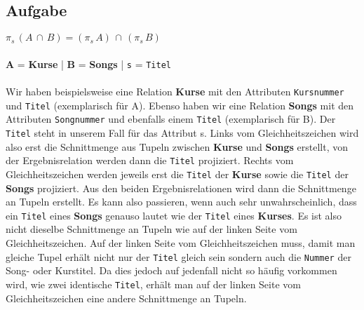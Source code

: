 \documentclass[11pt,a4paper,DIV=9]{scrartcl}
\newcounter{temp}
\newcommand{\aufgabe}[1]{
  \setcounter{temp}{\value{subsection}}
  \setcounter{subsection}{#1}
  \addtocounter{subsection}{-1}
  \subsection{Aufgabe}
  \setcounter{subsection}{\value{temp}}
}
\begin{document}
\aufgabe{3}
$ \pi _{s}\, (A\, \cap \, B) = (\pi _{s} \, A)\, \cap \,(\pi _{s}\, B)$
\\\\ \textbf{A} = \textbf{Kurse} | \textbf{B} = \textbf{Songs} | \texttt{s} = \texttt{Titel} 
\\\\Wir haben beispielsweise eine Relation \textbf{Kurse} mit den Attributen \texttt{Kursnummer} und \texttt{Titel} (exemplarisch f\"ur A). Ebenso haben wir eine Relation \textbf{Songs} mit den Attributen \texttt{Songnummer} und ebenfalls einem \texttt{Titel} (exemplarisch f\"ur B). Der \texttt{Titel} steht in unserem Fall f\"ur das Attribut s. Links vom Gleichheitszeichen wird also erst die Schnittmenge aus Tupeln zwischen \textbf{Kurse} und \textbf{Songs} erstellt, von der Ergebnisrelation werden dann die \texttt{Titel} projiziert. Rechts vom Gleichheitszeichen werden jeweils erst die \texttt{Titel} der \textbf{Kurse} sowie die \texttt{Titel} der \textbf{Songs} projiziert. Aus den beiden Ergebnisrelationen wird dann die Schnittmenge an Tupeln erstellt. Es kann also passieren, wenn auch sehr unwahrscheinlich, dass ein \texttt{Titel} eines \textbf{Songs} genauso lautet wie der \texttt{Titel} eines \textbf{Kurses}. Es ist also nicht dieselbe Schnittmenge an Tupeln wie auf der linken Seite vom Gleichheitszeichen. Auf der linken Seite vom Gleichheitszeichen muss, damit man gleiche Tupel erh\"alt nicht nur der \texttt{Titel} gleich sein sondern auch die \texttt{Nummer} der Song- oder Kurstitel. Da dies jedoch auf jedenfall nicht so h\"aufig vorkommen wird, wie zwei identische \texttt{Titel}, erh\"alt man auf der linken Seite vom Gleichheitszeichen eine andere Schnittmenge an Tupeln.
\end{document}
